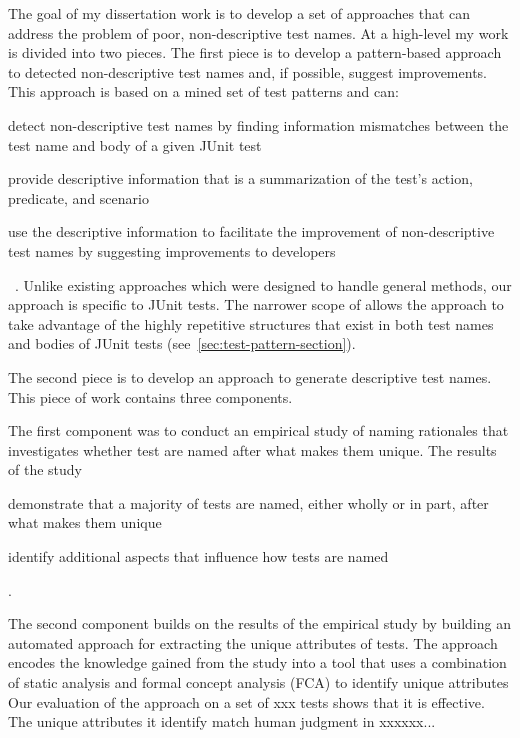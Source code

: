 The goal of my dissertation work is to develop a set of approaches that can address the problem of poor, non-descriptive test names.
%
At a high-level my work is divided into two pieces.
%
The first piece is to develop a pattern-based approach to detected non-descriptive test names and, if possible, suggest improvements.
%
This approach is based on a mined set of test patterns and can:
%
\begin{enumerate*}
\item detect non-descriptive test names by finding information mismatches between the test name and body of a given JUnit test
\item provide descriptive information that is a summarization of the test's action, predicate, and scenario
\item use the descriptive information to facilitate the improvement of non-descriptive test names by suggesting improvements to developers
\end{enumerate*}~\cite{wu2020pattern}.
%
Unlike existing approaches which were designed to handle general methods, our approach is specific to JUnit tests.
%
The narrower scope of allows the approach to take advantage of the highly repetitive structures that exist in both test names and bodies of JUnit tests (see~\cref{sec:test-pattern-section}).
%

The second piece is to develop an approach to generate descriptive test names.
% 
This piece of work contains three components.

The first component was to conduct an empirical study of naming rationales that investigates whether test are named after what makes them unique.
%
The results of the study
\begin{enumerate*}
\item demonstrate that a majority of tests are named, either wholly or in part, after what makes them unique
\item identify additional aspects that influence how tests are named
\end{enumerate*}.

The second component builds on the results of the empirical study by building an automated approach for extracting the unique attributes of tests.
% 
The approach encodes the knowledge gained from the study into a tool that uses a combination of static analysis and formal concept analysis (FCA) to identify unique attributes 
%
Our evaluation of the approach on a set of xxx tests shows that it is effective.
%
The unique attributes it identify match human judgment in xxxxxx...


